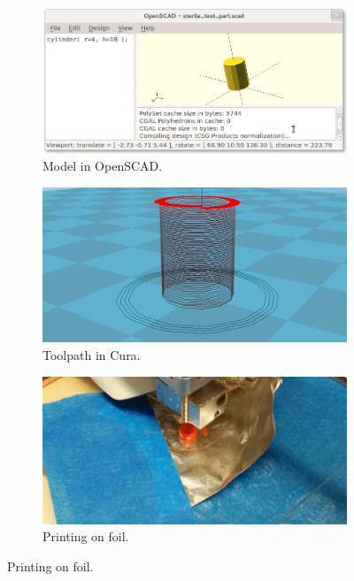 \documentclass[fleqn,10pt]{wlpeerj}
\begin{document}
\begin{figure}
    \centering
    \begin{subfigure}[b]{0.32\textwidth}
        \centering
        \includegraphics[width=\textwidth]{Fig5a}
        \caption{Model in OpenSCAD.}
        \label{fig:openscad}
    \end{subfigure}
    \hfill
    \begin{subfigure}[b]{0.32\textwidth}
        \centering
        \includegraphics[width=\textwidth]{Fig5b}
        \caption{Toolpath in Cura.}
        \label{fig:cura}
    \end{subfigure}
    \hfill
    \begin{subfigure}[b]{0.32\textwidth}
        \centering
        \includegraphics[width=\textwidth]{Fig5c}
        \caption{Printing on foil.}
        \label{fig:foil}
    \end{subfigure}


\end{figure}
\end{document}
